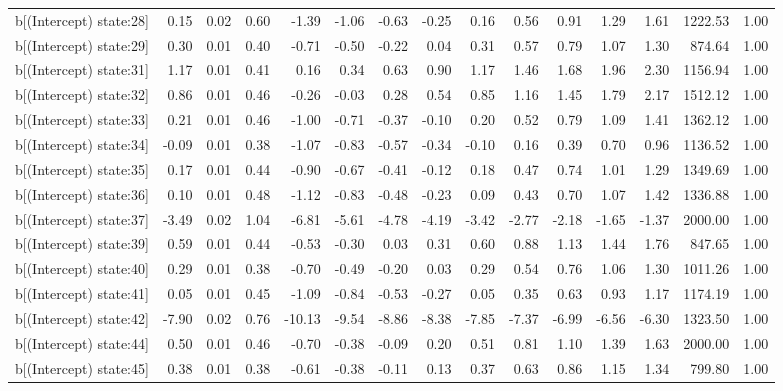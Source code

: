 \begin{table}[ht]
\begin{tabular}{rrrrrrrrrrrrrrr}
  b[(Intercept) state:28] & 0.15 & 0.02 & 0.60 & -1.39 & -1.06 & -0.63 & -0.25 & 0.16 & 0.56 & 0.91 & 1.29 & 1.61 & 1222.53 & 1.00 \\ 
  b[(Intercept) state:29] & 0.30 & 0.01 & 0.40 & -0.71 & -0.50 & -0.22 & 0.04 & 0.31 & 0.57 & 0.79 & 1.07 & 1.30 & 874.64 & 1.00 \\ 
  b[(Intercept) state:31] & 1.17 & 0.01 & 0.41 & 0.16 & 0.34 & 0.63 & 0.90 & 1.17 & 1.46 & 1.68 & 1.96 & 2.30 & 1156.94 & 1.00 \\ 
  b[(Intercept) state:32] & 0.86 & 0.01 & 0.46 & -0.26 & -0.03 & 0.28 & 0.54 & 0.85 & 1.16 & 1.45 & 1.79 & 2.17 & 1512.12 & 1.00 \\ 
  b[(Intercept) state:33] & 0.21 & 0.01 & 0.46 & -1.00 & -0.71 & -0.37 & -0.10 & 0.20 & 0.52 & 0.79 & 1.09 & 1.41 & 1362.12 & 1.00 \\ 
  b[(Intercept) state:34] & -0.09 & 0.01 & 0.38 & -1.07 & -0.83 & -0.57 & -0.34 & -0.10 & 0.16 & 0.39 & 0.70 & 0.96 & 1136.52 & 1.00 \\ 
  b[(Intercept) state:35] & 0.17 & 0.01 & 0.44 & -0.90 & -0.67 & -0.41 & -0.12 & 0.18 & 0.47 & 0.74 & 1.01 & 1.29 & 1349.69 & 1.00 \\ 
  b[(Intercept) state:36] & 0.10 & 0.01 & 0.48 & -1.12 & -0.83 & -0.48 & -0.23 & 0.09 & 0.43 & 0.70 & 1.07 & 1.42 & 1336.88 & 1.00 \\ 
  b[(Intercept) state:37] & -3.49 & 0.02 & 1.04 & -6.81 & -5.61 & -4.78 & -4.19 & -3.42 & -2.77 & -2.18 & -1.65 & -1.37 & 2000.00 & 1.00 \\ 
  b[(Intercept) state:39] & 0.59 & 0.01 & 0.44 & -0.53 & -0.30 & 0.03 & 0.31 & 0.60 & 0.88 & 1.13 & 1.44 & 1.76 & 847.65 & 1.00 \\ 
  b[(Intercept) state:40] & 0.29 & 0.01 & 0.38 & -0.70 & -0.49 & -0.20 & 0.03 & 0.29 & 0.54 & 0.76 & 1.06 & 1.30 & 1011.26 & 1.00 \\ 
  b[(Intercept) state:41] & 0.05 & 0.01 & 0.45 & -1.09 & -0.84 & -0.53 & -0.27 & 0.05 & 0.35 & 0.63 & 0.93 & 1.17 & 1174.19 & 1.00 \\ 
  b[(Intercept) state:42] & -7.90 & 0.02 & 0.76 & -10.13 & -9.54 & -8.86 & -8.38 & -7.85 & -7.37 & -6.99 & -6.56 & -6.30 & 1323.50 & 1.00 \\ 
  b[(Intercept) state:44] & 0.50 & 0.01 & 0.46 & -0.70 & -0.38 & -0.09 & 0.20 & 0.51 & 0.81 & 1.10 & 1.39 & 1.63 & 2000.00 & 1.00 \\ 
  b[(Intercept) state:45] & 0.38 & 0.01 & 0.38 & -0.61 & -0.38 & -0.11 & 0.13 & 0.37 & 0.63 & 0.86 & 1.15 & 1.34 & 799.80 & 1.00 \\ 

\end{tabular}
\end{table}
